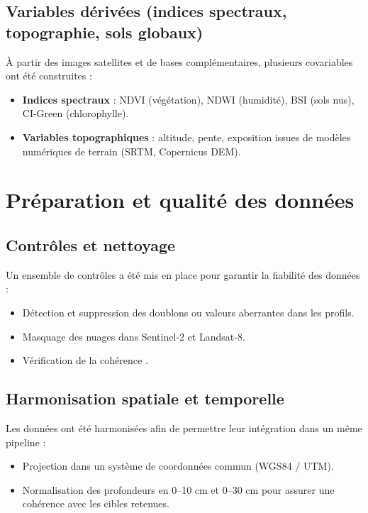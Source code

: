 \documentclass[12pt,a4paper,oneside]{report}
\begin{document}
\subsection{Variables dérivées (indices spectraux, topographie, sols globaux)}
À partir des images satellites et de bases complémentaires, plusieurs covariables ont été construites :
\begin{itemize}
  \item \textbf{Indices spectraux} : NDVI (végétation), NDWI (humidité), BSI (sols nus), CI-Green (chlorophylle).
  \item \textbf{Variables topographiques} : altitude, pente, exposition issues de modèles numériques de terrain (SRTM, Copernicus DEM).
\end{itemize}

\section{Préparation et qualité des données}

\subsection{Contrôles et nettoyage}
Un ensemble de contrôles a été mis en place pour garantir la fiabilité des données :
\begin{itemize}
  \item Détection et suppression des doublons ou valeurs aberrantes dans les profils.
  \item Masquage des nuages dans Sentinel-2 et Landsat-8.
  \item Vérification de la cohérence .
\end{itemize}

\subsection{Harmonisation spatiale et temporelle}
Les données ont été harmonisées afin de permettre leur intégration dans un même pipeline :
\begin{itemize}
  \item Projection dans un système de coordonnées commun (WGS84 / UTM).
  \item Normalisation des profondeurs en 0--10 cm et 0--30 cm pour assurer une cohérence avec les cibles retenues.
\end{itemize}
\end{document}
